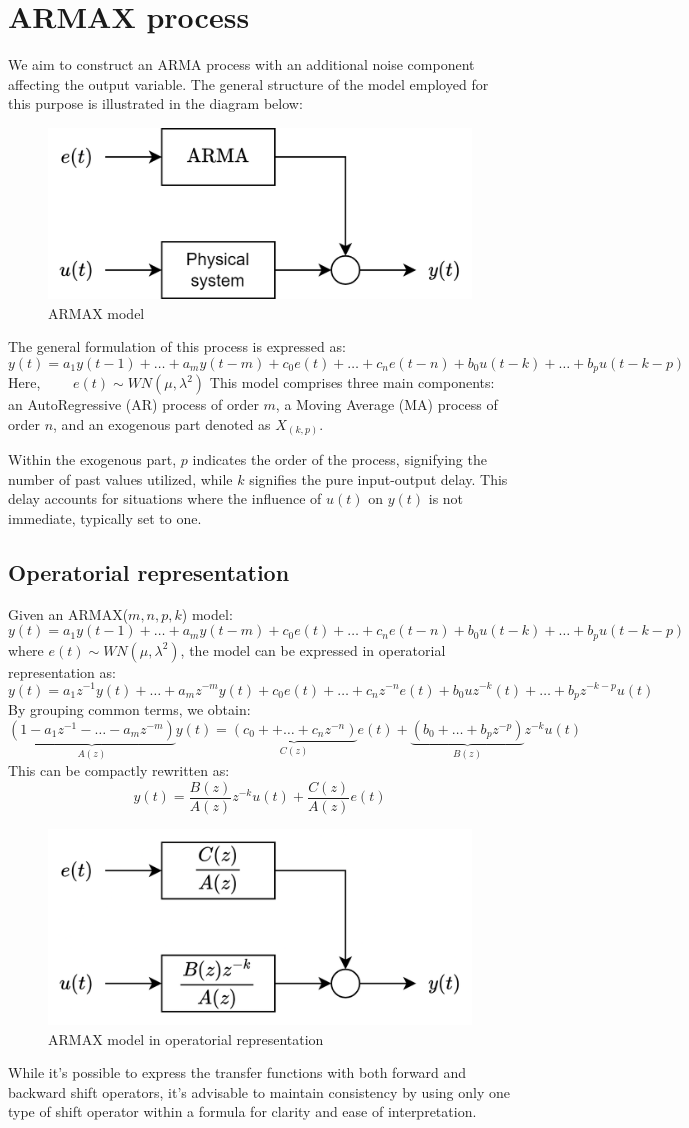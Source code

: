 \section{ARMAX process}

We aim to construct an ARMA process with an additional noise component affecting the output variable. 
The general structure of the model employed for this purpose is illustrated in the diagram below:
\begin{figure}[H]
    \centering
    \includegraphics[width=0.5\linewidth]{images/armax.png}
    \caption{ARMAX model}
\end{figure}
The general formulation of this process is expressed as:
\[y(t)=a_1y(t-1)+\dots+a_my(t-m)+c_0e(t)+\dots+c_ne(t-n)+b_0u(t-k)+\dots+b_pu(t-k-p)\] 
Here, $\qquad e(t)\sim WN(\mu,\lambda^2)$
This model comprises three main components: an AutoRegressive (AR) process of order $m$, a Moving Average (MA) process of order $n$, and an exogenous part denoted as $X_{(k,p)}$.

Within the exogenous part, $p$ indicates the order of the process, signifying the number of past values utilized, while $k$ signifies the pure input-output delay. 
This delay accounts for situations where the influence of $u(t)$ on $y(t)$ is not immediate, typically set to one.

\subsection{Operatorial representation}
Given an ARMAX($m,n,p,k$) model:
\[y(t)=a_1y(t-1)+\dots+a_my(t-m)+c_0e(t)+\dots+c_ne(t-n)+b_0u(t-k)+\dots+b_pu(t-k-p)\] 
where $e(t)\sim WN(\mu,\lambda^2)$, the model can be expressed in operatorial representation as:
\[y(t)=a_1z^{-1}y(t)+\dots+a_mz^{-m}y(t)+c_0e(t)+\dots+c_nz^{-n}e(t)+b_0uz^{-k}(t)+\dots+b_pz^{-k-p}u(t)\]
By grouping common terms, we obtain:
\[\underbrace{\left(1-a_1z^{-1}-\dots-a_mz^{-m}\right)}_{A(z)} y(t)=\underbrace{\left(c_0++\dots+c_nz^{-n}\right)}_{C(z)} e(t)+\underbrace{\left(b_0+\dots+b_pz^{-p}\right)}_{B(z)} z^{-k}u(t)\]
This can be compactly rewritten as:
\[y(t)=\dfrac{B(z)}{A(z)}z^{-k}u(t)+\dfrac{C(z)}{A(z)}e(t)\]
\begin{figure}[H]
    \centering
    \includegraphics[width=0.5\linewidth]{images/armaxblock.png}
    \caption{ARMAX model in operatorial representation}
\end{figure}
While it's possible to express the transfer functions with both forward and backward shift operators, it's advisable to maintain consistency by using only one type of shift operator within a formula for clarity and ease of interpretation.